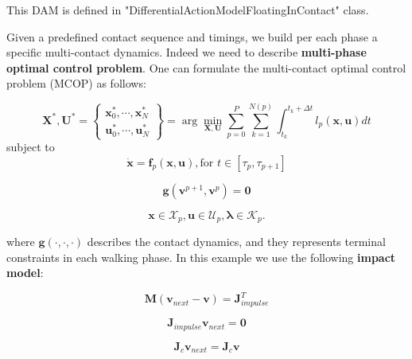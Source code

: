 This DAM is defined in "DifferentialActionModelFloatingInContact" class.

Given a predefined contact sequence and timings, we build per each phase a specific multi-contact dynamics. Indeed we need to describe \textbf{multi-phase optimal control problem}. One can formulate the multi-contact optimal control problem (MCOP) as follows:

$$\mathbf{X}^*,\mathbf{U}^*=
\begin{Bmatrix} \mathbf{x}^*_0,\cdots,\mathbf{x}^*_N \\
				  \mathbf{u}^*_0,\cdots,\mathbf{u}^*_N
\end{Bmatrix} =
\arg\min_{\mathbf{X},\mathbf{U}} \sum_{p=0}^P \sum_{k=1}^{N(p)} \int_{t_k}^{t_k+\Delta t} l_p(\mathbf{x},\mathbf{u})dt$$
subject to
$$ \mathbf{\dot{x}} = \mathbf{f}_p(\mathbf{x},\mathbf{u}), \text{for } t \in [\tau_p,\tau_{p+1}]$$

$$ \mathbf{g}(\mathbf{v}^{p+1},\mathbf{v}^p) = \mathbf{0}$$

$$ \mathbf{x}\in\mathcal{X}_p, \mathbf{u}\in\mathcal{U}_p, \boldsymbol{\lambda}\in\mathcal{K}_p.$$

where $\mathbf{g}(\cdot,\cdot,\cdot)$ describes the contact dynamics, and they represents terminal constraints in each walking phase. In this example we use the following \textbf{impact model}:

$$\mathbf{M}(\mathbf{v}_{next}-\mathbf{v}) = \mathbf{J}_{impulse}^T$$

$$\mathbf{J}_{impulse} \mathbf{v}_{next} = \mathbf{0}$$

$$\mathbf{J}_{c} \mathbf{v}_{next} = \mathbf{J}_{c} \mathbf{v}$$




